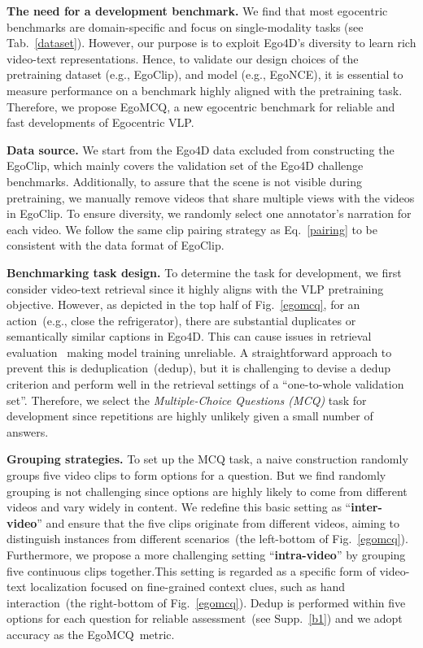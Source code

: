 \documentclass{article}
\newcommand{\vlp}{Egocentric VLP}
\newcommand{\dataset}{EgoClip}
\newcommand{\model}{EgoNCE\xspace}
\newcommand{\eval}{EgoMCQ}
\begin{document}
\textbf{The need for a development benchmark.}
We find that most egocentric benchmarks are domain-specific and focus on single-modality tasks (see Tab.~\ref{dataset}). However, our purpose is to exploit Ego4D's diversity to learn rich video-text representations.
Hence, to validate our design choices of the pretraining dataset (e.g., \dataset), and model (e.g., \model), it is essential to measure performance on a benchmark highly aligned with the pretraining task. 
Therefore, we propose \eval, a new egocentric benchmark for reliable and fast developments of \vlp. 

\textbf{Data source.}
We start from the Ego4D data excluded from constructing the \dataset, which mainly covers the validation set of the Ego4D challenge benchmarks.
Additionally, to assure that the scene is not visible during pretraining, we manually remove videos that share multiple views with the videos in \dataset.
To ensure diversity, we randomly select one annotator's narration for each video.
We follow the same clip pairing strategy as Eq.~\ref{pairing} to be consistent with the data format of \dataset.

\textbf{Benchmarking task design.}
To determine the task for development, we first consider video-text retrieval since it highly aligns with the VLP pretraining objective. 
However, as depicted in the top half of Fig.~\ref{egomcq}, for an action~(e.g., close the refrigerator), there are substantial duplicates or semantically similar captions in Ego4D. This can cause issues in retrieval evaluation~\cite{wray2021semantic} making model training unreliable.
A straightforward approach to prevent this is deduplication~(dedup), but it is challenging to devise a dedup criterion and perform well in the retrieval settings of a ``one-to-whole validation set''.
Therefore, we select the \textit{Multiple-Choice Questions (MCQ)} task for development since repetitions are highly unlikely given a small number of answers.

\textbf{Grouping strategies.}
To set up the MCQ task, a naive construction randomly groups five video clips to form options for a question. But we find randomly grouping is not challenging since options are highly likely to come from different videos and vary widely in content.
We redefine this basic setting as ``\textbf{inter-video}'' and ensure that the five clips originate from different videos, aiming to distinguish instances from different scenarios~(the left-bottom of Fig.~\ref{egomcq}).
Furthermore, we propose a more challenging setting ``\textbf{intra-video}'' by grouping five continuous clips together.This setting is regarded as a specific form of video-text localization focused on fine-grained context clues, such as hand interaction~(the right-bottom of Fig.~\ref{egomcq}).
Dedup is performed within five options for each question for reliable assessment~(see Supp.~\ref{b1}) and we adopt accuracy as the \eval~metric.
\end{document}

